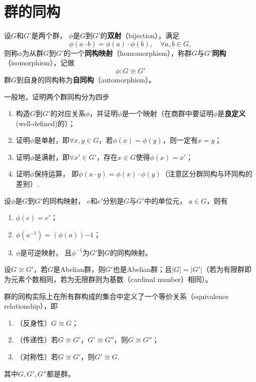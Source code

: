 \section{群的同构}
\begin{definition}\label{homomorphism}
	设$G$和$G'$是两个群， $\phi$是$G$到$G'$的\textbf{双射}（bijection），满足
	\begin{equation}
		\phi(a\cdot b) = \phi(a)\cdot\phi(b),\quad \forall a, b\in G,
	\end{equation}
	则称$\phi$为从群$G$到$G'$的一个\textbf{同构映射}（homomorphism），称群$G$与$G'$\textbf{同构}（isomorphism），记做
	\begin{equation*}
		\phi: G\cong G'
	\end{equation*}
	群$G$到自身的同构称为\textbf{自同构}（automorphism）。
\end{definition}
\medskip
一般地，证明两个群同构分为四步
\begin{enumerate}
	\item 构造$G$到$G'$的对应关系$\phi$，并证明$\phi$是一个映射（在商群中要证明$\phi$是\textbf{良定义}(well-defined)的）；
	\item 证明$\phi$是单射，即$\forall x, y\in G$，若$\phi(x) = \phi(y)$，则一定有$x=y$；
	\item 证明$\phi$是满射，即$\forall x'\in G'$，存在$x\in G$使得$\phi(x) = x'$；
	\item 证明$\phi$保持运算， 即$\phi(x\cdot y) = \phi(x)\cdot \phi(y)$（注意区分群同构与环同构的差别）.
\end{enumerate}
\medskip
\begin{theorem}[群同构的性质]
	设$\phi$是$G$到$G'$的同构映射， $e$和$e'$分别是$G$与$G'$中的单位元， $a\in G$，则有
	\begin{enumerate}
		\item $\phi(e) = e'$；
		\item $\phi(a^{-1}) = (\phi(a)){-1}$；
		\item $\phi$是可逆映射， 且$\phi^{-1}$为$G'$到$G$的同构映射。
	\end{enumerate}
\end{theorem}
\begin{corollary}
	设$G\cong G'$，若$G$是Abelian群，则$G'$也是Abelian群；且$|G| = |G'|$（若为有限群即为元素个数相同，若为无限群则为基数（cardinal number）相同）。
\end{corollary}
\begin{theorem}
	群的同构实际上在所有群构成的集合中定义了一个等价关系（equivalence relationship），即
	\begin{enumerate}
		\item （反身性）$G\cong G$；
		\item （传递性）若$G\cong G'$，$G'\cong G''$，则$G\cong G''$；
		\item （对称性）若$G\cong G'$，则$G' \cong G$.
	\end{enumerate}
	其中$G, G', G''$都是群。
\end{theorem}
